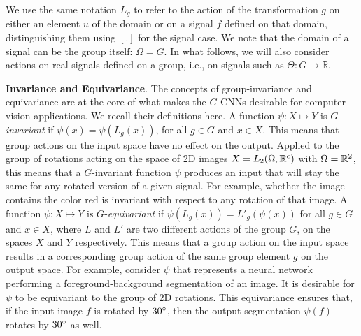 We use the same notation $L_g$ to refer to the action of the transformation $g$ on either an element $u$ of the domain or on a signal $f$ defined on that domain, distinguishing them using $[ . ]$ for the signal case. We note that the domain of a signal can be the group itself: $\Omega = G$. In what follows, we will also consider actions on real signals defined on a group, i.e., on signals such as $\Theta: G \rightarrow \mathbb{R}$.






\textbf{Invariance and Equivariance}. The concepts of group-invariance and equivariance are at the core of what makes the $G$-CNNs desirable for computer vision applications. We recall their definitions here. A function $\psi: X \mapsto Y$ is $G$-\textit{invariant} if $\psi(x) = \psi(L_g(x))$, for all $g \in G$ and $x \in X$. This means that group actions on the input space have no effect on the output. Applied to the group of rotations acting on the space of 2D images $X=L_2(\Omega, \mathbb{R}^c)$ with $\Omega = \mathbb{R}^2$, this means that a $G$-invariant function $\psi$ produces an input that will stay the same for any rotated version of a given signal. For example, whether the image contains the color red is invariant with respect to any rotation of that image. A function $\psi: X \mapsto Y$ is $G$-\textit{equivariant} if $\psi(L_g(x)) = L'_g(\psi(x))$ for all $g \in G$ and $x \in X$, where $L$ and $L'$ are two different actions of the group $G$, on the spaces $X$ and $Y$ respectively. This means that a group action on the input space results in a corresponding group action of the same group element $g$ on the output space. For example, consider $\psi$ that represents a neural network performing a foreground-background segmentation of an image. It is desirable for $\psi$ to be equivariant to the group of 2D rotations. This equivariance ensures that, if the input image $f$ is rotated by $30\degree$, then the output segmentation $\psi(f)$ rotates by $30\degree$ as well.


